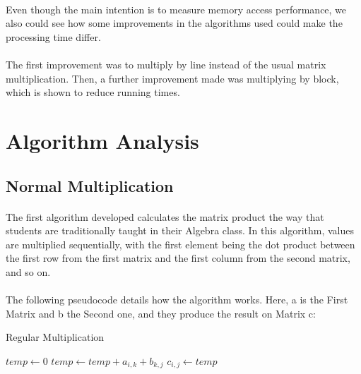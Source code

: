 \documentclass{report}
\begin{document}
    \paragraph{}Even though the main intention is to measure memory access performance, we also could see how some improvements in the algorithms used could make the processing time differ.

    \paragraph{}The first improvement was to multiply by line instead of the usual matrix multiplication. Then, a further improvement made was multiplying by block, which is shown to reduce running times.

    \newpage

    \section*{Algorithm Analysis}

    \subsection*{Normal Multiplication}

    \paragraph{}The first algorithm developed calculates the matrix product the way that students are traditionally taught in their Algebra class. In this algorithm, values are multiplied sequentially, with the first element being the dot product between the first row from the first matrix and the first column from the second matrix, and so on.

    \paragraph{}The following pseudocode details how the algorithm works. Here, a is the First Matrix and b the Second one, and they produce the result on Matrix c:

    \begin{algorithm}
      \caption{Regular Multiplication}\label{euclid}
      \begin{algorithmic}[1]
        \State $temp \leftarrow 0$
        \State $temp \leftarrow temp + a_{i, k} + b_{k, j}$
        \EndFor
        \State $c_{i, j} \leftarrow temp$
        \EndFor
        \EndFor
        \EndProcedure
      \end{algorithmic}
    \end{algorithm}
\end{document}
